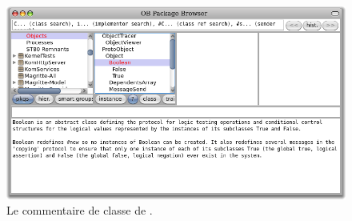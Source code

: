 \documentclass[a4paper,10pt,twoside]{book}
\begin{document}




\begin{figure}[hbt]
\centerline {\includegraphics[width=\textwidth]{classComment}}
\caption{Le commentaire de classe de \mbox{.}
}
\end{figure}
\end{document}
